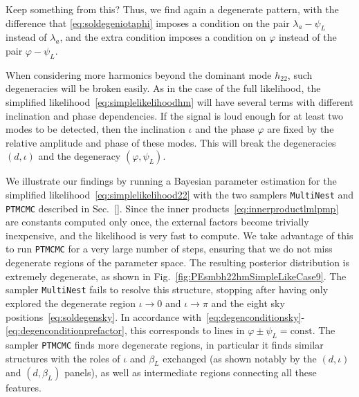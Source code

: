 \documentclass[aps,showpacs,twocolumn,prd,superscriptaddress,nofootinbib]{revtex4-1}
\newcommand{\be}{\begin{equation}}
\newcommand{\ee}{\end{equation}}
\newcommand{\bsub}{\begin{subequations}}
\newcommand{\esub}{\end{subequations}}
\newcommand\betaL{{\beta_{L}}}
\newcommand\psiL{{\psi_{L}}}
\newcommand{\jgb}[1]{{\color{DarkGreen} #1}}
\begin{document}
\jgb{Keep something from this?}
Thus, we find again a degenerate pattern, with the difference that \eqref{eq:soldegeniotaphi} imposes a condition on the pair $\lambda_{a} - \psiL$ instead of $\lambda_{a}$, and the extra condition imposes a condition on $\varphi$ instead of the pair $\varphi - \psiL$.

When considering more harmonics beyond the dominant mode $h_{22}$, such degeneracies will be broken easily. As in the case of the full likelihood, the simplified likelihood~\eqref{eq:simplelikelihoodhm} will have several terms with different inclination and phase dependencies. If the signal is loud enough for at least two modes to be detected, then the inclination $\iota$ and the phase $\varphi$ are fixed by the relative amplitude and phase of these modes. This will break the degeneracies $(d, \iota)$ and the degeneracy $(\varphi, \psiL)$.  

We illustrate our findings by running a Bayesian parameter estimation for the simplified likelihood~\eqref{eq:simplelikelihood22} with the two samplers \texttt{MultiNest} and \texttt{PTMCMC} described in Sec.~\ref{}. Since the inner products~\eqref{eq:innerproductlmlpmp} are constants computed only once, the external factors become trivially inexpensive, and the likelihood is very fast to compute. We take advantage of this to run \texttt{PTMCMC} for a very large number of steps, ensuring that we do not miss degenerate regions of the parameter space. The resulting posterior distribution is extremely degenerate, as shown in Fig.~\ref{fig:PEsmbh22hmSimpleLikeCase9}. The sampler \texttt{MultiNest} fails to resolve this structure, stopping after having only explored the degenerate region $\iota \rightarrow 0$ and $\iota \rightarrow \pi$ and the eight sky positions~\eqref{eq:soldegensky}. In accordance with~\eqref{eq:degenconditionsky}-\eqref{eq:degenconditionprefactor}, this corresponds to lines in $\varphi \pm \psiL = \mathrm{const}$. The sampler \texttt{PTMCMC} finds more degenerate regions, in particular it finds similar structures with the roles of $\iota$ and $\betaL$ exchanged (as shown notably by the $(d,\iota)$ and $(d,\betaL)$ panels), as well as intermediate regions connecting all these features. 
\end{document}
